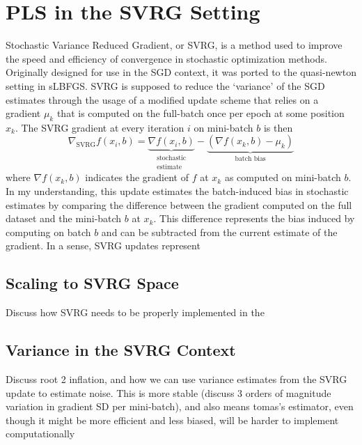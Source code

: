 \documentclass{article}
\begin{document}
\section{PLS in the SVRG Setting}
Stochastic Variance Reduced Gradient, or SVRG, is a method used to improve the speed and efficiency of convergence in stochastic optimization methods. Originally designed for use in the SGD context, it was ported to the quasi-newton setting in sLBFGS. SVRG is supposed to reduce the `variance' of the SGD estimates through the usage of a modified update scheme that relies on a gradient $\mu_k$ that is computed on the full-batch once per epoch at some position $x_k$. The SVRG gradient at every iteration $i$ on mini-batch $b$ is then
\begin{equation}
\label{eq:svrg}
\nabla_{\text{SVRG}} f(x_i, b) = \underbrace{\nabla f(x_i, b)}_{\substack{\text{stochastic} \\ \text{estimate}}} - \underbrace{(\nabla f(x_k, b) - \mu_k)}_{\text{batch bias}}
\end{equation}
where $\nabla f(x_k, b)$ indicates the gradient of $f$ at $x_k$ as computed on mini-batch $b$. In my understanding, this update estimates the batch-induced bias in stochastic estimates by comparing the difference between the gradient computed on the full dataset and the mini-batch $b$ at $x_k$. This difference represents the bias induced by computing on batch $b$ and can be subtracted from the current estimate of the gradient. In a sense, SVRG updates represent 
\subsection{Scaling to SVRG Space}
Discuss how SVRG needs to be properly implemented in the 
\subsection{Variance in the SVRG Context}
Discuss root 2 inflation, and how we can use variance estimates from the SVRG update to estimate noise. This is more stable (discuss 3 orders of magnitude variation in gradient SD per mini-batch), and also means tomas's estimator, even though it might be more efficient and less biased, will be harder to implement computationally
\end{document}
